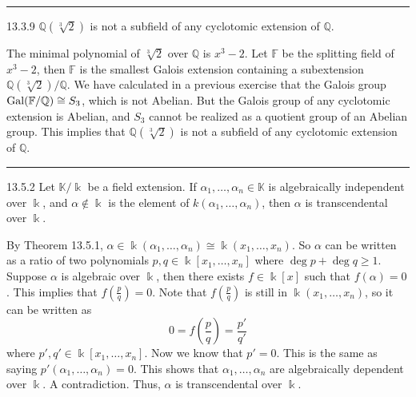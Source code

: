 \documentclass[a4paper, 12pt]{article}
\begin{document}
\noindent\rule{7in}{2.8pt}
\begin{problem}{13.3.9}
\(\mathbb{Q}(\sqrt[3]{2})\) is not a subfield of any cyclotomic extension of \(\mathbb{Q}\).
\end{problem}
\begin{solution}
The minimal polynomial of \(\sqrt[3]{2}\) over \(\mathbb{Q}\) is \(x^3-2\). Let \(\mathbb{F}\) be the splitting field of \(x^3-2\), then \(\mathbb{F}\) is the smallest Galois extension containing a subextension \(\mathbb{Q}(\sqrt[3]{2})/\mathbb{Q}\). We have calculated in a previous exercise that the Galois group \(\text{Gal}(\mathbb{F}/\mathbb{Q})\cong S_3\), which is not Abelian. But the Galois group of any cyclotomic extension is Abelian, and \(S_3\) cannot be realized as a quotient group of an Abelian group. This implies that \(\mathbb{Q}(\sqrt[3]{2})\) is not a subfield of any cyclotomic extension of \(\mathbb{Q}\).
\end{solution}

\noindent\rule{7in}{2.8pt}
\begin{problem}{13.5.2}
Let \(\mathbb{K}/\Bbbk\) be a field extension. If \(\alpha_1,\ldots,\alpha_n\in \mathbb{K}\) is algebraically independent over \(\Bbbk\), and \(\alpha\notin \Bbbk\) is the element of \(k(\alpha_1,\ldots,\alpha_n)\), then \(\alpha\) is transcendental over \(\Bbbk\). 
\end{problem}
\begin{solution}
By Theorem 13.5.1, \(\alpha\in \Bbbk(\alpha_1,\ldots,\alpha_n)\cong \Bbbk(x_1,\ldots,x_n)\). So \(\alpha\) can be written as a ratio of two polynomials \(p,q\in \Bbbk[x_1,\ldots,x_n]\) where \(\deg p+\deg q\geq 1\). Suppose \(\alpha\) is algebraic over \(\Bbbk\), then there exists \(f\in \Bbbk[x]\) such that \(f(\alpha)=0\). This implies that \(f(\frac{p}{q})=0\). Note that \(f(\frac{p}{q})\) is still in \(\Bbbk(x_1,\ldots,x_n)\), so it can be written as 
\[0=f(\frac{p}{q})=\frac{p'}{q'}\]
where \(p',q'\in \Bbbk[x_1,\ldots,x_n]\). Now we know that \(p'=0\). This is the same as saying \(p'(\alpha_1,\ldots,\alpha_n)=0\). This shows that \(\alpha_1,\ldots,\alpha_n\) are algebraically dependent over \(\Bbbk\). A contradiction. Thus, \(\alpha\) is transcendental over \(\Bbbk\).
\end{solution}
\end{document}
